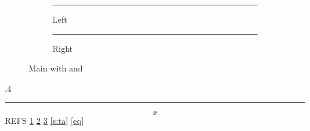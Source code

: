 \documentclass{article}
\begin{document}
\listoffigures
\begin{figure}[h]
\centering
\begin{subfigure}{.4\linewidth}\centering\rule{2cm}{1cm}\caption{Left}\label{s:a}\end{subfigure}%
\begin{subfigure}{.4\linewidth}\centering\rule{2cm}{1cm}\caption{Right}\label{s:b}\end{subfigure}
\caption{Main with  and }\label{s:main}
\end{figure}
\begin{table}[h]
\caption{Tables}\label{s:t}
\begin{subtable}{.4\linewidth}\centering\caption{Sub table}\label{s:ta}\rule{2cm}{1cm}\end{subtable}
\end{table}
\begin{equation}x\label{eq}\end{equation}
REFS \ref{s:a} \ref{s:b}   \ref{s:main} \ref{s:ta}  \ref{eq}
\end{document}
